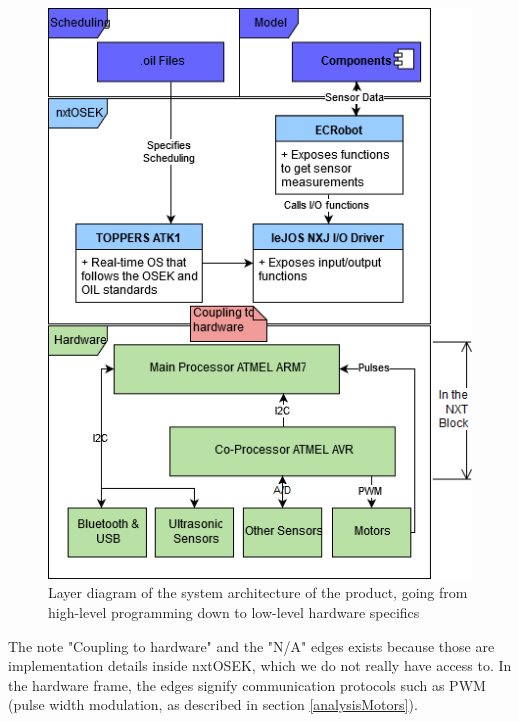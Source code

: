 \begin{figure}[H]
    \includegraphics[width=\textwidth]{Images/Design/abstractionLayerDiagram.png}
    \caption{Layer diagram of the system architecture of the product, going from high-level programming down to low-level hardware specifics}
    \label{fig:abstractionLayers}
\end{figure}

The note "Coupling to hardware" and the "N/A" edges exists because those are implementation details inside nxtOSEK, which we do not really have access to. In the hardware frame, the edges signify communication protocols such as PWM (pulse width modulation, as described in section \ref{analysisMotors}). 
